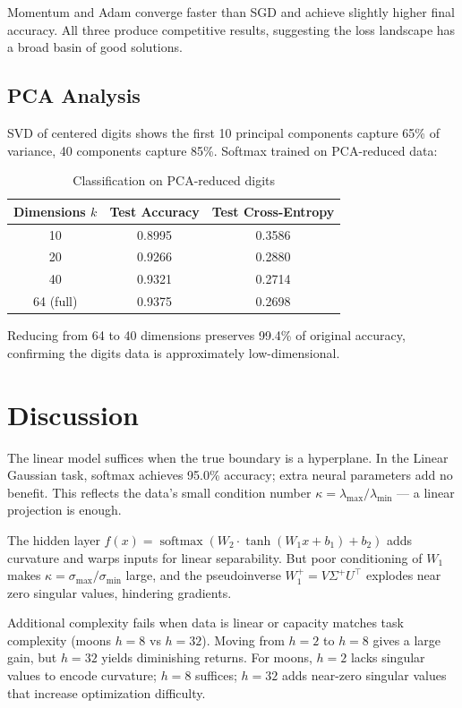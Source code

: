 \documentclass[sigconf,screen,nonacm,nofonts]{acmart}
\begin{document}
Momentum and Adam converge faster than SGD and achieve slightly higher final accuracy. All three produce competitive results, suggesting the loss landscape has a broad basin of good solutions.

\subsection{PCA Analysis}
SVD of centered digits shows the first 10 principal components capture 65\% of variance, 40 components capture 85\%. Softmax trained on PCA-reduced data:

\begin{table}[htbp]
\centering
\caption{Classification on PCA-reduced digits}
\label{tab:pca_classification}
\begin{tabular}{ccc}
\toprule
Dimensions \(k\) & Test Accuracy & Test Cross-Entropy \\
\midrule
10 & 0.8995 & 0.3586 \\
20 & 0.9266 & 0.2880 \\
40 & 0.9321 & 0.2714 \\
64 (full) & 0.9375 & 0.2698 \\
\bottomrule
\end{tabular}
\end{table}

Reducing from 64 to 40 dimensions preserves 99.4\% of original accuracy, confirming the digits data is approximately low-dimensional.

\section{Discussion}

The linear model suffices when the true boundary is a hyperplane. In the Linear Gaussian task, softmax achieves 95.0\% accuracy; extra neural parameters add no benefit. This reflects the data's small condition number \(\kappa = \lambda_{\max}/\lambda_{\min}\) — a linear projection is enough.

The hidden layer \(f(x) = \operatorname{softmax}(W_2 \cdot \tanh(W_1x + b_1) + b_2)\) adds curvature and warps inputs for linear separability. But poor conditioning of \(W_1\) makes \(\kappa = \sigma_{\max}/\sigma_{\min}\) large, and the pseudoinverse \(W_1^+ = V\Sigma^+U^\top\) explodes near zero singular values, hindering gradients.

Additional complexity fails when data is linear or capacity matches task complexity (moons \(h=8\) vs \(h=32\)). Moving from \(h=2\) to \(h=8\) gives a large gain, but \(h=32\) yields diminishing returns. For moons, \(h=2\) lacks singular values to encode curvature; \(h=8\) suffices; \(h=32\) adds near-zero singular values that increase optimization difficulty.
\end{document}
